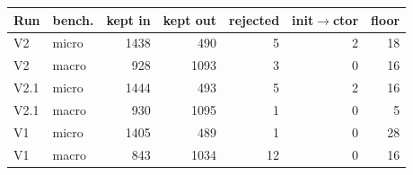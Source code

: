 \begin{tabular}{l l rrrrr}
\toprule
Run & bench. & kept in & kept out & rejected & init$\to$ctor & floor\\
\midrule
V2 & micro & 1438 & 490 & 5 & 2 & 18 \\
V2 & macro & 928 & 1093 & 3 & 0 & 16 \\
V2.1 & micro & 1444 & 493 & 5 & 2 & 16 \\
V2.1 & macro & 930 & 1095 & 1 & 0 & 5 \\
V1 & micro & 1405 & 489 & 1 & 0 & 28 \\
V1 & macro & 843 & 1034 & 12 & 0 & 16 \\
\bottomrule
\end{tabular}

